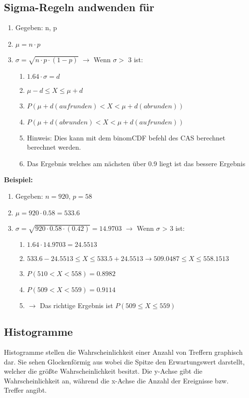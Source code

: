 	\subsection{Sigma-Regeln andwenden für }
		\begin{enumerate}
			\item Gegeben: n, p
			\item $ \mu = n \cdot p$
			\item $\sigma = \sqrt{n \cdot p \cdot (1-p)}$ $\rightarrow$ Wenn $\sigma >$ 3 ist:
			\begin{enumerate}
				\item $1.64 \cdot \sigma = d$
				\item $\mu -d \leq X \leq \mu + d$
				\item $P(\mu + d (aufrunden) < X <\mu + d (abrunden))$
				\item $P(\mu + d (abrunden) < X <\mu + d (aufrunden))$
				\item Hinweis: Dies kann mit dem binomCDF befehl des CAS berechnet berechnet werden.
				\item Das Ergebnis welches am nächsten über 0.9 liegt ist das bessere Ergebnis
			\end{enumerate}
		\end{enumerate}
	\textbf{Beispiel:}
	\begin{enumerate}
			\item Gegeben: $n = 920$,  $p = 58$
			\item $ \mu = 920 \cdot 0.58 = 533.6$
			\item $\sigma = \sqrt{920 \cdot 0.58 \cdot (0.42)} = 14.9703$ $\rightarrow$ Wenn $\sigma$ > 3 ist:
			\begin{enumerate}
				\item $1.64 \cdot 14.9703 = 24.5513$
				\item $533.6 - 24.5513 \leq X \leq 533.5 + 24.5513 \rightarrow 509.0487 \leq X \leq 558.1513$
				\item $P(510 < X < 558) = 0.8982$
				\item $P(509 < X <559) = 0.9114$
				\item $\rightarrow$ Das richtige Ergebnis ist $P(509 \leq X \leq 559)$
			\end{enumerate}
		\end{enumerate}
	\subsection{Histogramme}
	Histogramme stellen die Wahrscheinlichkeit einer Anzahl von Treffern graphisch dar. Sie sehen Glockenförmig aus wobei die Spitze den Erwartungswert darstellt, welcher die größte Wahrscheinlichkeit besitzt. Die y-Achse gibt die Wahrscheinlichkeit an, während die x-Achse die Anzahl der Ereignisse bzw. Treffer angibt.
